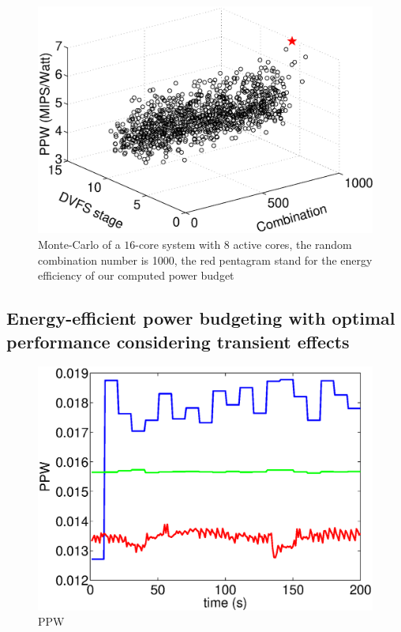 \begin{figure}
\centering
\includegraphics[width=1\linewidth]{fig/best_steady.eps}
\caption{Monte-Carlo of a $16$-core system with $8$ active cores, the random combination number is 1000, the red pentagram stand for the energy efficiency of our computed power budget}
\end{figure}

\subsection{Energy-efficient power budgeting with optimal performance considering transient effects}

\begin{figure}
\centering
\includegraphics[width=1\linewidth]{fig/PPW.eps}
\caption{PPW}
\end{figure}

